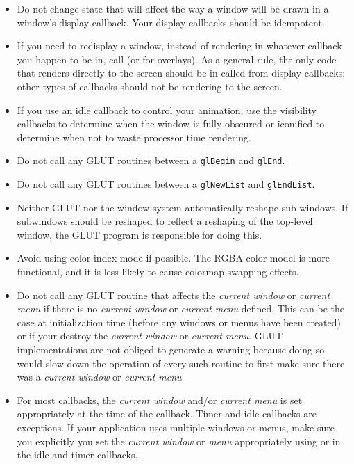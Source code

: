 \documentclass[titlepage,twoside]{article}
\begin{document}
\begin{itemize}

\item
Do not change state that will affect the way a window
will be drawn in a window's display callback.
Your display callbacks should be idempotent.

\item
If you need to redisplay a window, instead of rendering in
whatever callback you happen to be in, call 
(or  for overlays).
As a general rule, the only code that renders directly to the screen
should be in called from display callbacks; other types of callbacks
should not be rendering to the screen.

\item
If you use an idle callback to control your animation, use the
visibility callbacks to determine when the window is fully obscured
or iconified to determine when not to waste processor time rendering.

\item
Do not call any GLUT routines between a {\tt glBegin} and {\tt glEnd}.

\item
Do not call any GLUT routines between a {\tt glNewList} and {\tt glEndList}.

\item
Neither GLUT nor the window system automatically reshape sub-windows.
If subwindows should be reshaped to reflect a reshaping of the
top-level window, the GLUT program is responsible for doing this.

\item
Avoid using color index mode if possible.  The RGBA
color model is more functional, and it is less likely to cause colormap
swapping effects.

\item
Do not call any GLUT routine that affects the {\em current window} or
{\em current menu} if there is no {\em current window} or {\em current
menu} defined.  This can be the case at initialization time (before any
windows or menus have been created) or if your destroy the {\em
current window} or {\em current menu}.  GLUT implementations are not
obliged to generate a warning because doing so would slow down the
operation of every such routine to first make sure there was a {\em
current window} or {\em current menu}.

\item
For most callbacks, the {\em current window} and/or {\em current menu} is
set appropriately at the time of the callback.  Timer and idle callbacks
are exceptions.  If your application uses multiple windows or menus,
make sure you explicitly you set the {\em current
window} or {\em menu} appropriately using  or
 in the idle and timer callbacks.


\end{itemize}
\end{document}

